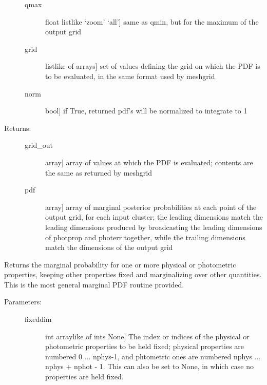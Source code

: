 \documentclass[letterpaper,10pt,english]{sphinxmanual}
\begin{document}
\begin{fulllineitems}
\begin{fulllineitems}
\begin{description}
\begin{description}
\item[{qmax}] \leavevmode{[}float \textbar{} listlike \textbar{} `zoom' \textbar{} `all'{]}
same as qmin, but for the maximum of the output grid

\item[{grid}] \leavevmode{[}listlike of arrays{]}
set of values defining the grid on which the PDF is to
be evaluated, in the same format used by meshgrid

\item[{norm}] \leavevmode{[}bool{]}
if True, returned pdf's will be normalized to integrate
to 1

\end{description}

\item[{Returns:}] \leavevmode\begin{description}
\item[{grid\_out}] \leavevmode{[}array{]}
array of values at which the PDF is evaluated; contents
are the same as returned by meshgrid

\item[{pdf}] \leavevmode{[}array{]}
array of marginal posterior probabilities at each point
of the output grid, for each input cluster; the leading
dimensions match the leading dimensions produced by
broadcasting the leading dimensions of photprop and
photerr together, while the trailing dimensions match
the dimensions of the output grid

\end{description}

\end{description}

\end{fulllineitems}


\begin{fulllineitems}
\label{bayesphot:slugpy.bayesphot.bp.bp.mpdf_gen}
Returns the marginal probability for one or more physical or
photometric properties, keeping other properties fixed and
marginalizing over other quantities. This is the most general
marginal PDF routine provided.
\begin{description}
\item[{Parameters:}] \leavevmode\begin{description}
\item[{fixeddim}] \leavevmode{[}int \textbar{} arraylike of ints \textbar{} None{]}
The index or indices of the physical or photometric
properties to be held fixed; physical properties are
numbered 0 ... nphys-1, and phtometric ones are numbered
nphys ... nphys + nphot - 1. This can also be set to
None, in which case no properties are held fixed.


\end{description}
\end{description}
\end{fulllineitems}
\end{fulllineitems}
\end{document}
